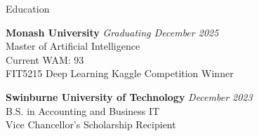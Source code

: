 \documentclass[
	10pt, %
]{resume} %
\begin{document}

\begin{rSection}{Education}

	\textbf{Monash University} \hfill \textit{Graduating December 2025} \\
	Master of Artificial Intelligence \\
	Current WAM: 93 \\
	FIT5215 Deep Learning Kaggle Competition Winner

	\textbf{Swinburne University of Technology} \hfill \textit{December 2023} \\
	B.S. in Accounting and Business IT \\
	Vice Chancellor's Scholarship Recipient


\end{rSection}

\end{document}
